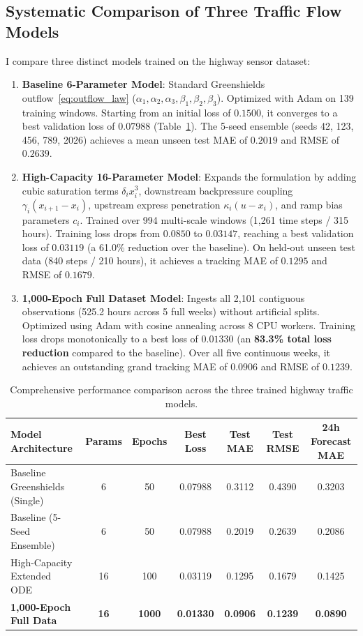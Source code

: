\documentclass[runningheads]{llncs}
\begin{document}
\subsection{Systematic Comparison of Three Traffic Flow Models}
I compare three distinct models trained on the highway sensor dataset:
\begin{enumerate}
    \item \textbf{Baseline 6-Parameter Model}: Standard Greenshields outflow~\eqref{eq:outflow_law} ($\alpha_1, \alpha_2, \alpha_3, \beta_1, \beta_2, \beta_3$). Optimized with Adam on 139 training windows. Starting from an initial loss of $0.1500$, it converges to a best validation loss of $0.07988$ (Table~\ref{tab:model_comparison}). The 5-seed ensemble (seeds 42, 123, 456, 789, 2026) achieves a mean unseen test MAE of $0.2019$ and RMSE of $0.2639$.
    \item \textbf{High-Capacity 16-Parameter Model}: Expands the formulation by adding cubic saturation terms $\delta_i x_i^3$, downstream backpressure coupling $\gamma_i (x_{i+1} - x_i)$, upstream express penetration $\kappa_i (u - x_i)$, and ramp bias parameters $c_i$. Trained over 994 multi-scale windows (1,261 time steps / 315 hours). Training loss drops from $0.0850$ to $0.03147$, reaching a best validation loss of $\mathbf{0.03119}$ (a 61.0\% reduction over the baseline). On held-out unseen test data (840 steps / 210 hours), it achieves a tracking MAE of $0.1295$ and RMSE of $0.1679$.
    \item \textbf{1,000-Epoch Full Dataset Model}: Ingests all 2,101 contiguous observations (525.2 hours across 5 full weeks) without artificial splits. Optimized using Adam with cosine annealing across 8 CPU workers. Training loss drops monotonically to a best loss of $\mathbf{0.01330}$ (an \textbf{83.3\% total loss reduction} compared to the baseline). Over all five continuous weeks, it achieves an outstanding grand tracking MAE of $\mathbf{0.0906}$ and RMSE of $\mathbf{0.1239}$.
\end{enumerate}

\begin{table}[htbp]
\centering
\caption{Comprehensive performance comparison across the three trained highway traffic models.}
\label{tab:model_comparison}
\small
\setlength{\tabcolsep}{3.5pt}
\begin{tabular}{lcccccc}
\toprule
\textbf{Model Architecture} & \textbf{Params} & \textbf{Epochs} & \textbf{Best Loss} & \textbf{Test MAE} & \textbf{Test RMSE} & \textbf{24h Forecast MAE} \\
\midrule
Baseline Greenshields (Single) & 6  & 50   & 0.07988 & 0.3112 & 0.4390 & 0.3203 \\
Baseline (5-Seed Ensemble)      & 6  & 50   & 0.07988 & 0.2019 & 0.2639 & 0.2086 \\
High-Capacity Extended ODE     & 16 & 100  & 0.03119 & 0.1295 & 0.1679 & 0.1425 \\
\textbf{1,000-Epoch Full Data}  & \textbf{16} & \textbf{1000} & \textbf{0.01330} & \textbf{0.0906} & \textbf{0.1239} & \textbf{0.0890} \\
\bottomrule
\end{tabular}
\end{table}
\end{document}
